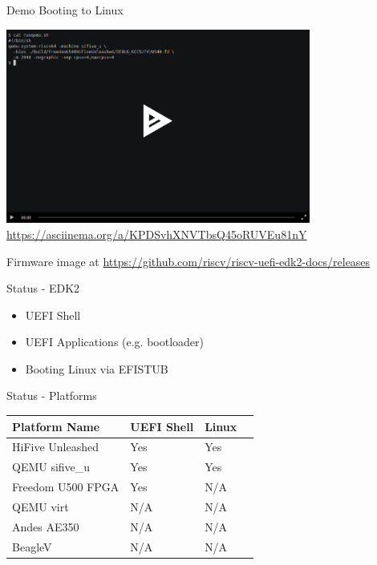 \documentclass[
  10pt
]{beamer}
\begin{document}
\begin{frame}{Demo Booting to Linux}
  \begin{center}
     \includegraphics[width=0.75\textwidth]{resources/asciinema.png}
    \href{https://asciinema.org/a/KPDSvhXNVTbsQ45oRUVEu81nY}{https://asciinema.org/a/KPDSvhXNVTbsQ45oRUVEu81nY}
  \end{center}

  \tiny{Firmware image at \href{https://github.com/riscv/riscv-uefi-edk2-docs/releases}{https://github.com/riscv/riscv-uefi-edk2-docs/releases}}

\end{frame}

\begin{frame}{Status - EDK2}
  \begin{itemize}
    \item UEFI Shell
    \item UEFI Applications (e.g. bootloader)
    \item Booting Linux via EFISTUB
  \end{itemize}
\end{frame}

\begin{frame}{Status - Platforms}
  \begin{center}
    \begin{tabular}{|l|l|l|l|}
      \hline
      Platform Name     & UEFI Shell & Linux \\
      \hline
      HiFive Unleashed  & Yes        & Yes \\
      QEMU sifive\_u    & Yes        & Yes \\
      Freedom U500 FPGA & Yes        & N/A \\
      QEMU virt         & N/A        & N/A \\
      Andes AE350       & N/A        & N/A \\
      BeagleV           & N/A        & N/A \\
      \hline
    \end{tabular}
  \end{center}
\end{frame}
\end{document}
